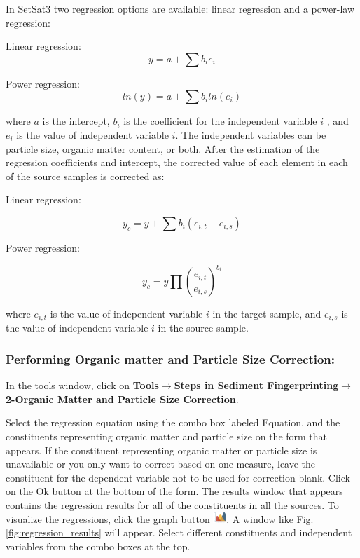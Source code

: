 \documentclass[12pt]{report}
\begin{document}
In SetSat3 two regression options are available: linear regression and a power-law regression: 

Linear regression: 
\begin{equation}
    y = a + \sum b_i e_i
\end{equation}

Power regression: 
\begin{equation}
    ln(y) = a + \sum b_i ln(e_i)
\end{equation}

where $a$ is the intercept, $b_i$ is the coefficient for the independent variable $i$ , and $e_i$ is the value of independent variable $i$. The independent variables can be particle size, organic matter content, or both. After the estimation of the regression coefficients and intercept, the corrected value of each element in each of the source samples is corrected as:

Linear regression:

\begin{equation}
    y_c = y + \sum b_i(e_{i,t} - e_{i,s})
\end{equation}

Power regression:

\begin{equation}
    y_c = y \prod \left(\frac{e_{i,t}}{e_{i,s}}\right)^{b_i}
\end{equation}

where $e_{i,t}$ is the value of independent variable $i$ in the target sample, and $e_{i,s}$ is the value of independent variable $i$ in the source sample.

\subsubsection{Performing Organic matter and  Particle Size Correction:}

In the tools window, click on \textbf{Tools}$\rightarrow$\textbf{Steps in Sediment Fingerprinting}$\rightarrow$\textbf{2-Organic Matter and Particle Size Correction}. 

Select the regression equation using the combo box labeled Equation, and the constituents representing organic matter and particle size on the form that appears. If the constituent representing organic matter or particle size is unavailable or you only want to correct based on one measure, leave the constituent for the dependent variable not to be used for correction blank. Click on the Ok button at the bottom of the form. The results window that appears contains the regression results for all of the constituents in all the sources. To visualize the regressions, click the graph button \includegraphics[width=0.5cm]{Figures/Graph.png}. A window like Fig. \ref{fig:regression_results} will appear. Select different constituents and independent variables from the combo boxes at the top. 
\end{document}
